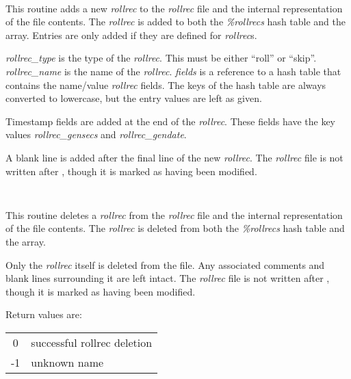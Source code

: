 \begin{description}

\item {}\verb" "

This routine adds a new {\it rollrec} to the {\it rollrec} file and the
internal representation of the file contents.  The {\it rollrec} is added to
both the {\it \%rollrecs} hash table and the {\it \@rollreclines} array.
Entries are only added if they are defined for {\it rollrec}s.

{\it rollrec\_type} is the type of the {\it rollrec}.  This must be either
``roll'' or ``skip''.  {\it rollrec\_name} is the name of the {\it rollrec}.
{\it fields} is a reference to a hash table that contains the name/value {\it
rollrec} fields.  The keys of the hash table are always converted to
lowercase, but the entry values are left as given.

Timestamp fields are added at the end of the {\it rollrec}.  These fields have
the key values {\it rollrec\_gensecs} and {\it rollrec\_gendate}.

A blank line is added after the final line of the new {\it rollrec}.
The {\it rollrec} file is not written after , though
it is marked as having been modified.

\item {}\verb" "

This routine deletes a {\it rollrec} from the {\it rollrec} file and the
internal representation of the file contents.  The {\it rollrec} is deleted
from both the {\it \%rollrecs} hash table and the {\it \@rollreclines} array.

Only the {\it rollrec} itself is deleted from the file.  Any associated
comments and blank lines surrounding it are left intact.
The {\it rollrec} file is not written after , though
it is marked as having been modified.

Return values are:

\begin{table}[ht]
\begin{center}
\begin{tabular}{cl}
0 & successful rollrec deletion \\
-1 & unknown name \\
\end{tabular} 
\end{center}
\end{table}


\end{description}

